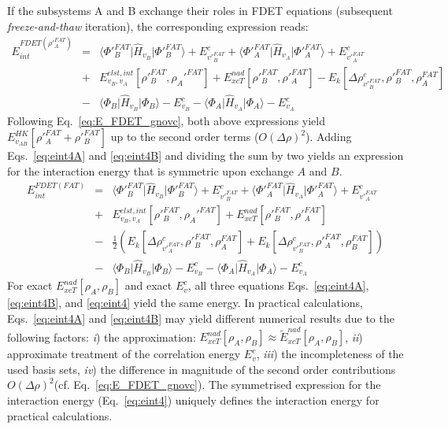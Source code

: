 \documentclass[amsmath,amssymb,preprint,aip,jcp]{revtex4-1}
\begin{document}
If the subsystems A and B exchange their roles in FDET equations (subsequent \textit{freeze-and-thaw} iteration), the corresponding 
expression reads:
 \begin{eqnarray}
E_{int}^{FDET(\rho'^{FAT}_A)} 
&=& \langle\Phi'^{FAT}_{B}\vert \hat{H}_{v_B}\vert \Phi'^{FAT}_{B}\rangle + E^{c}_{v'^{FAT}_B} + \langle\Phi'^{FAT}_{A}\vert \hat{H}_{v_A}\vert \Phi'^{FAT}_{A}\rangle + E^{c}_{v'^{FAT}_A} \label{eq:eint4B}\\ \nonumber
&+& E^{elst,int}_{v_B,v_A}[\rho'^{FAT}_B,\rho_A'^{FAT}] + {E}_{xcT}^{nad}[\rho'^{FAT}_B,\rho'^{FAT}_A]- E_k[\Delta \rho^{c}_{v'^{FAT}_B}, \rho'^{FAT}_B, \rho^{FAT}_A] \nonumber\\
&-& 
\langle\Phi_{B}\vert \hat{H}_{v_B}\vert \Phi_{B}\rangle - E^{c}_{v_B}
- \langle\Phi_{A}\vert \hat{H}_{v_A}\vert \Phi_{A}\rangle - E^{c}_{v_A}\nonumber
\end{eqnarray}
Following Eq.~\ref{eq:E_FDET_gnovc}, both above expressions yield $E_{v_{AB}}^{HK}[\rho'^{FAT}_A+\rho'^{FAT}_B]$ up to the second order terms ($O(\Delta\rho)^2$). 
Adding Eqs.~\ref{eq:eint4A} and \ref{eq:eint4B} and dividing the sum by two yields an expression for the interaction energy that is symmetric upon exchange $A$ and $B$.
\begin{eqnarray}
E_{int}^{FDET(FAT)} 
&=& \langle\Phi'^{FAT}_{B}\vert \hat{H}_{v_B}\vert \Phi'^{FAT}_{B}\rangle + E^{c}_{v'^{FAT}_B} + \langle\Phi'^{FAT}_{A}\vert \hat{H}_{v_A}\vert \Phi'^{FAT}_{A}\rangle + E^{c}_{v'^{FAT}_A} \label{eq:eint4}\\ \nonumber
&+& E^{elst,int}_{v_B,v_A}[\rho'^{FAT}_B,\rho_A'^{FAT}] + {E}_{xcT}^{nad}[\rho'^{FAT}_B,\rho'^{FAT}_A] \nonumber \\
&-& \frac{1}{2}\left(E_k[\Delta \rho^{c}_{v'^{FAT}_A}, \rho'^{FAT}_B, \rho^{FAT}_A] + E_k[\Delta \rho^{c}_{v'^{FAT}_B}, \rho'^{FAT}_A, \rho^{FAT}_B] \right) \nonumber\\
&-& 
\langle\Phi_{B}\vert \hat{H}_{v_B}\vert \Phi_{B}\rangle - E^{c}_{v_B}
- \langle\Phi_{A}\vert \hat{H}_{v_A}\vert \Phi_{A}\rangle - E^{c}_{v_A}\nonumber
\end{eqnarray}
For exact ${E}_{xcT}^{nad}[\rho_A,\rho_B]$ and exact $E^c_{v}$, all three equations
Eqs.~\ref{eq:eint4A}, \ref{eq:eint4B}, and \ref{eq:eint4} yield the same energy.
In practical calculations, 
Eqs.~\ref{eq:eint4A} and \ref{eq:eint4B} may yield different numerical results due to the following factors:
{\it i}) the approximation: ${E}_{xcT}^{nad}[\rho_A,\rho_B]\approx \tilde{E}_{xcT}^{nad}[\rho_A,\rho_B]$, 
{\it ii}) approximate treatment of the correlation energy $E^c_{v}$, {\it iii}) the incompleteness of the used basis sets, {\it iv}) the difference in magnitude of the second order contributions $O(\Delta\rho)^2$(cf. Eq.~\ref{eq:E_FDET_gnovc}).
The symmetrised expression for the interaction energy (Eq.~\ref{eq:eint4}) uniquely defines the interaction energy for practical calculations.
\end{document}
